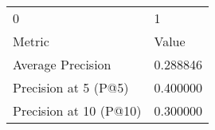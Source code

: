 \begin{tabular}{ll}
0 & 1 \\
Metric & Value \\
Average Precision & 0.288846 \\
Precision at 5 (P@5) & 0.400000 \\
Precision at 10 (P@10) & 0.300000 \\
\end{tabular}
